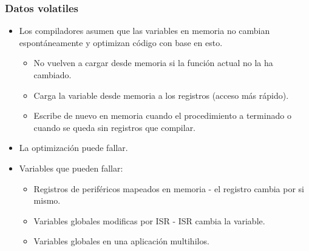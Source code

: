 \documentclass[10.5pt,scale=1.0,t,aspectratio=169,hyperref={pdfpagelabels=false}]{beamer}
\begin{document}
\begin{frame}
	\frametitle{Datos volatiles}
	\begin{itemize}
		\item Los compiladores asumen que las variables en memoria no cambian espontáneamente y optimizan código con base en esto.
		\begin{itemize}
			\item No vuelven a cargar desde memoria si la función actual no la ha cambiado. 
			\item Carga la variable desde memoria a los registros (acceso más rápido).
			\item Escribe de nuevo en memoria cuando el procedimiento a terminado o cuando se queda sin registros que compilar. 
		\end{itemize}
		\item La optimización puede fallar.
		\item Variables que pueden fallar:
		\begin{itemize}
			\item Registros de periféricos mapeados en memoria - el registro cambia por si mismo.
			\item Variables globales modificas por ISR - ISR cambia la variable.
			\item Variables globales en una aplicación multihilos. 
		\end{itemize}
	\end{itemize}
\end{frame}
\end{document}
